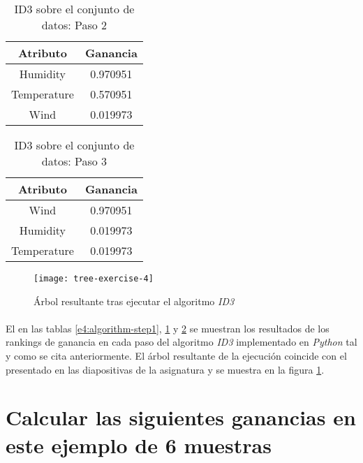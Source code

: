 \documentclass[10pt, a4paper,spanish]{article}
\begin{document}
		\begin{table}[H]
			\centering
			\begin{tabular}{| c | c |}
				\hline
				Atributo 			& Ganancia \\ \hline
				Humidity 			& 0.970951 \\ \hline
				Temperature 	& 0.570951 \\ \hline
				Wind 					& 0.019973 \\ \hline
			\end{tabular}
			\caption{ID3 sobre el conjunto de datos: Paso 2}
			\label{e4:algorithm-step2}
		\end{table}

		\begin{table}[H]
			\centering
			\begin{tabular}{| c | c |}
				\hline
				Atributo 			& Ganancia \\ \hline
				Wind 					& 0.970951 \\ \hline
				Humidity 			& 0.019973 \\ \hline
				Temperature 	& 0.019973 \\ \hline
			\end{tabular}
			\caption{ID3 sobre el conjunto de datos: Paso 3}
			\label{e4:algorithm-step3}
		\end{table}

		\begin{figure}[h]
			\begin{center}
				\texttt{[image: tree-exercise-4]}
				\caption{Árbol resultante tras ejecutar el algoritmo \emph{ID3} \cite{subject:taa}}
			\end{center}
			\label{e4:tree}
		\end{figure}

		\paragraph{}
		El en las tablas \ref{e4:algorithm-step1}, \ref{e4:algorithm-step2} y \ref{e4:algorithm-step3} se muestran los resultados de los rankings de ganancia en cada paso del algoritmo \emph{ID3} implementado en \emph{Python} tal y como se cita anteriormente. El árbol resultante de la ejecución coincide con el presentado en las diapositivas de la asignatura \cite{subject:taa} y se muestra en la figura \ref{e4:tree}.



	\section{Calcular las siguientes ganancias en este ejemplo de 6 muestras}
\end{document}
